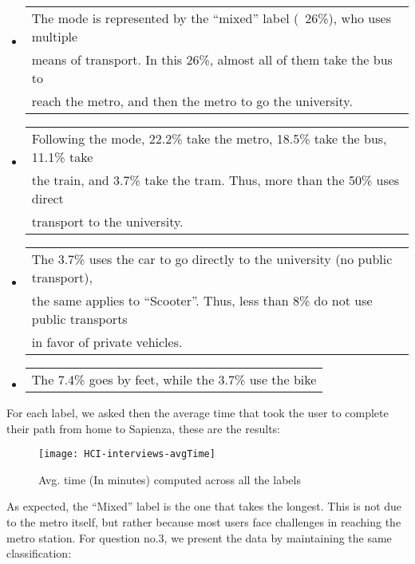 \documentclass{article}
\begin{document}
\begin{itemize}
  \item \begin{tabular}[t]{@{}l@{}}
          The mode is represented by the “mixed” label (~26\%), who uses multiple \\
          means of transport. In this 26\%, almost all of them take the bus to \\
          reach the metro, and then the metro to go the university. 
        \end{tabular}
        
  \item \begin{tabular}[t]{@{}l@{}}
          Following the mode, 22.2\% take the metro, 18.5\% take the bus, 11.1\% take \\ the train, and 3.7\% take the tram. Thus, more than the 50\% uses direct \\ transport to the university.
        \end{tabular}
        
    \item \begin{tabular}[t]{@{}l@{}}
         The 3.7\% uses the car to go directly to the university (no public transport), \\ the same applies to “Scooter”. Thus, less than 8\% do not use public transports \\ in favor of private vehicles.
          \end{tabular}
          
    \item \begin{tabular}[t]{@{}l@{}}
         The 7.4\% goes by feet, while the 3.7\% use the bike
         \end{tabular}
\end{itemize}
\newpage

For each label, we asked then the average time that took the user to complete their path from home to Sapienza, these are the results:

\begin{figure}[htbp]
  \centering
    \texttt{[image: HCI-interviews-avgTime]}
    \caption{Avg. time (In minutes) computed across all the labels}
\end{figure}

As expected, the “Mixed” label is the one that takes the longest. This is not due to the metro itself, but rather because most users face challenges in reaching the metro station. \newline
For question no.3, we present the data by maintaining the same classification:
\end{document}
